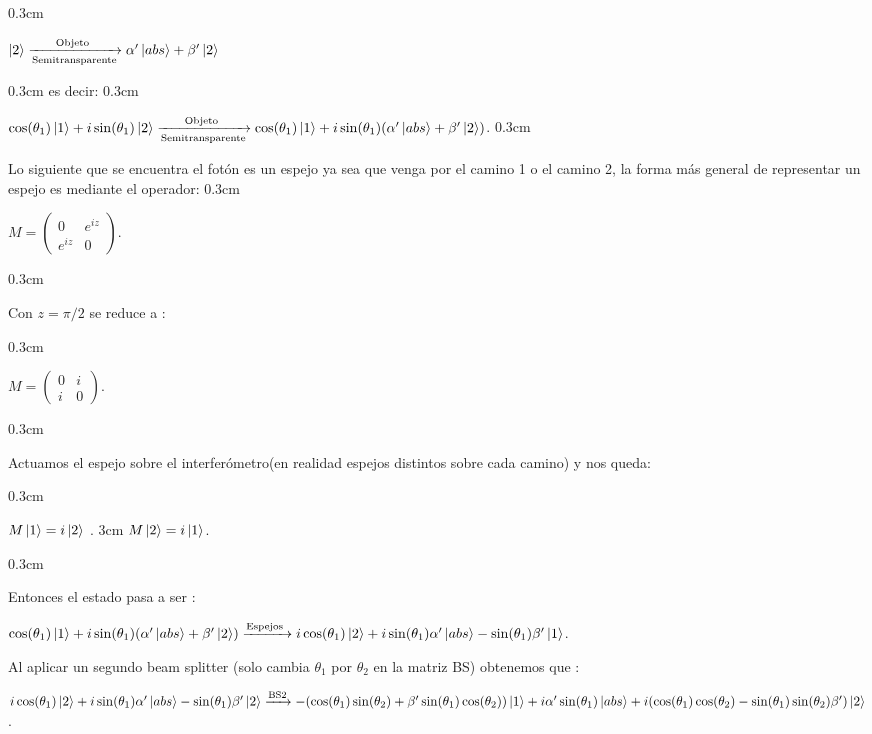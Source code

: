 \documentclass[11pt]{article}
\begin{document}
\vspace
{0.3cm}

$
\ket{2}\xrightarrow[\text{Semitransparente}]{\text{Objeto }}\alpha
' \ket{abs} +\beta' \ket{2} $

\vspace
{0.3cm}
es decir:
\vspace
{0.3cm}

$\cos(\theta_{1})\ket{1}+i\sin(\theta_{1})\ket{2}\xrightarrow[\text{Semitransparente}]{\text{Objeto }}\cos
(\theta_
{1})\ket
{1}+i\sin(\theta_
{1})(\alpha
' \ket
{abs
} +\beta' \ket
{2} )
$.
\vspace
{0.3cm}

Lo siguiente que se encuentra el fotón es un espejo ya sea que venga por el camino 1 o el camino 2, la forma más general de representar un espejo es mediante el operador:
\vspace
{0.3cm}

$M
=\begin
{pmatrix} 0& e^
{i z} \\ e^
{iz
} & 0 \end
{pmatrix}$.

\vspace
{0.3cm}

Con $z
=\pi/2$ se reduce a :

\vspace
{0.3cm}

$M
=\begin
{pmatrix} 0& i\\ i & 0 \end
{pmatrix}$.

\vspace
{0.3cm}

Actuamos el espejo sobre el interferómetro(en realidad espejos distintos sobre cada camino) y nos queda:

\vspace
{0.3cm}

$M
 \ket
{1}=i\ket
{2}$ .  
\hspace
{3cm}   
$M
\ket
{2}=i\ket
{1}$.

\vspace
{0.3cm}

Entonces el estado pasa a ser  :

\vspace{0.3cm}

$\cos
(\theta_
{1})\ket
{1}+i\sin(\theta_
{1})(\alpha
' \ket
{abs
} +\beta' \ket
{2} )\xrightarrow{\text{Espejos }}i\cos(\theta_{1})\ket{2}+i \sin(\theta_{1})\alpha'\ket{abs}-\sin(\theta_{1})\beta'\ket{1}$.

\vspace{0.3cm}

Al aplicar un segundo beam splitter
(solo cambia $\theta_
{1} $ por $ \theta_
{2} $ en la matriz BS) obtenemos que :


$i\cos(\theta_{1})\ket{2}+i \sin(\theta_{1})\alpha'\ket{abs}-\sin(\theta_{1})\beta'\ket{2}\xrightarrow{\text{BS2}}-
(\cos
(\theta_
{1})\sin(\theta_
{2})+\beta' \sin(\theta_
{1})\cos
(\theta_
{2}))\ket
{1}+i \alpha
' \sin(\theta_
{1})\ket
{abs
}+i(\cos
(\theta_
{1})\cos
(\theta_
{2})-\sin(\theta_
{1})\sin(\theta_
{2})\beta')\ket
{2}$.
\end{document}
